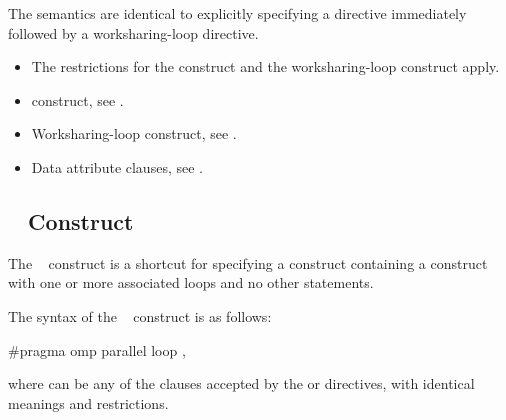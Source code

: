 \descr
The semantics are identical to explicitly specifying a  directive 
immediately followed by a worksharing-loop directive.

\restrictions
\begin{itemize}
\item The restrictions for the  construct and the
      worksharing-loop construct apply.
\end{itemize}

\crossreferences
\begin{itemize}
\item {} construct, see
.

\item Worksharing-loop construct, see
.

\item Data attribute clauses, see
.
\end{itemize}



\subsection{~ Construct}
\label{subsec:parallel loop Construct}

\summary
The ~ construct is a shortcut for specifying a 
 construct containing a  construct with one or 
more associated loops and no other statements.

\syntax
\begin{ccppspecific}
The syntax of the ~ construct is as follows:

\begin{ompcPragma}
#pragma omp parallel loop \plc{[clause[ [},\plc{] clause] ... ] new-line}
\end{ompcPragma}

where  can be any of the clauses accepted by the  or
 directives, with identical meanings and restrictions.
\end{ccppspecific}

